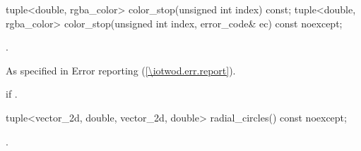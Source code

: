 \begin{itemdecl}
    tuple<double, rgba_color> color_stop(unsigned int index) const;
    tuple<double, rgba_color> color_stop(unsigned int index,
      error_code& ec) const noexcept;
\end{itemdecl}
\begin{itemdescr}
	\pnum
	\returns
	.

	\pnum
	\throws
	As specified in Error reporting (\ref{\iotwod.err.report}).
	
	\pnum
	\errors
	 if .

\end{itemdescr}

\begin{itemdecl}
    tuple<vector_2d, double, vector_2d, double> radial_circles() const noexcept;
\end{itemdecl}
\begin{itemdescr}
	\pnum
	\returns
	.

\end{itemdescr}
